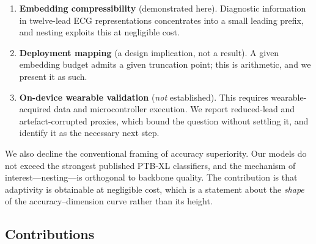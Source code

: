 \begin{enumerate}
\item \textbf{Embedding compressibility} (demonstrated here). Diagnostic
information in twelve-lead ECG representations concentrates into a small
leading prefix, and nesting exploits this at negligible cost.
\item \textbf{Deployment mapping} (a design implication, not a result). A
given embedding budget admits a given truncation point; this is arithmetic,
and we present it as such.
\item \textbf{On-device wearable validation} (\emph{not} established). This
requires wearable-acquired data and microcontroller execution. We report
reduced-lead and artefact-corrupted proxies, which bound the question without
settling it, and identify it as the necessary next step.
\end{enumerate}

We also decline the conventional framing of accuracy superiority. Our models
do not exceed the strongest published PTB-XL classifiers, and the mechanism of
interest---nesting---is orthogonal to backbone quality. The contribution is
that adaptivity is obtainable at negligible cost, which is a statement about
the \emph{shape} of the accuracy--dimension curve rather than its height.

\subsection{Contributions}

